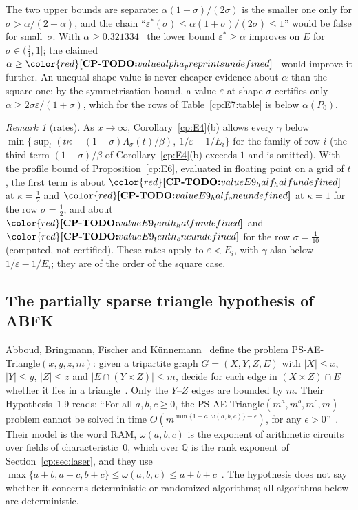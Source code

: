 \documentclass[11pt]{article}
\makeatletter
\theoremstyle{definition}
\theoremstyle{remark}
\newtheorem{remark}[theorem]{Remark}
\DeclareRobustCommand{\CPTODO}[1]{{\color{red}\textbf{[CP-TODO:} #1\textbf{]}}}
\providecommand{\eps}{\varepsilon}
\providecommand{\Q}{\mathbb{Q}}
\newcommand{\abs}[1]{\lvert #1\rvert}
\newcommand{\Lam}{\Lambda}                    %
\newcommand{\Pzero}{P_0}                      %
\newcommand{\cpv}[1]{\ifcsname cpv@#1\endcsname\csname cpv@#1\endcsname\else\CPTODO{value #1 undefined}\fi}
\newcommand{\AlphaVXXZ}{0.321334}%
\makeatother
\begin{document}
The two upper bounds are separate: $\alpha(1+\sigma)/(2\sigma)$ is the smaller one only for $\sigma>\alpha/(2-\alpha)$, and the chain ``$\eps^*(\sigma)\le\alpha(1+\sigma)/(2\sigma)\le1$'' would be false for small~$\sigma$. With $\alpha\ge\AlphaVXXZ$~\cite{VXXZ24} the lower bound $\eps^*\ge\alpha$ improves on $E$ for $\sigma\in(\frac34,1]$; the claimed $\alpha\ge\cpv{alpha_preprints}$~\cite{AvdBZ26,Uzn26} would improve it further. An unequal-shape value is never cheaper evidence about $\alpha$ than the square one: by the symmetrisation bound, a value $\eps$ at shape $\sigma$ certifies only $\alpha\ge2\sigma\eps/(1+\sigma)$, which for the rows of Table~\ref{cp:E7:table} is below $\alpha(\Pzero)$.

\begin{remark}[rates]\label{cp:E9}
As $x\to\infty$, Corollary~\ref{cp:E4}(b) allows every $\gamma$ below $\min\{\sup_t(t\kappa-(1+\sigma)\Lam_\sigma(t)/\beta),\ 1/\eps-1/E_i\}$ for the family of row $i$ (the third term $(1+\sigma)/\beta$ of Corollary~\ref{cp:E4}(b) exceeds $1$ and is omitted). With the profile bound of Proposition~\ref{cp:E6}, evaluated in floating point on a grid of $t$, the first term is about $\cpv{E9_half_half}$ at $\kappa=\frac12$ and $\cpv{E9_half_one}$ at $\kappa=1$ for the row $\sigma=\frac12$, and about $\cpv{E9_tenth_half}$ and $\cpv{E9_tenth_one}$ for the row $\sigma=\frac1{10}$ (computed, not certified). These rates apply to $\eps<E_i$, with $\gamma$ also below $1/\eps-1/E_i$; they are of the order of the square case.
\end{remark}

\subsection{The partially sparse triangle hypothesis of ABFK}\label{cp:sec:unequal-abfk}

Abboud, Bringmann, Fischer and Künnemann~\cite{ABFK24} define the problem PS-AE-Triangle$(x,y,z,m)$: given a tripartite graph $G=(X,Y,Z,E)$ with $\abs X\le x$, $\abs Y\le y$, $\abs Z\le z$ and $\abs{E\cap(Y\times Z)}\le m$, decide for each edge in $(X\times Z)\cap E$ whether it lies in a triangle~\cite[Definition~1.8]{ABFK24}. Only the $Y$--$Z$ edges are bounded by $m$. Their Hypothesis~1.9 reads: ``For all $a,b,c\ge0$, the PS-AE-Triangle$(m^a,m^b,m^c,m)$ problem cannot be solved in time $O(m^{\min\{1+a,\omega(a,b,c)\}-\epsilon})$, for any $\epsilon>0$''~\cite[Hypothesis~1.9]{ABFK24}. Their model is the word RAM, $\omega(a,b,c)$ is the exponent of arithmetic circuits over fields of characteristic~$0$, which over $\Q$ is the rank exponent of Section~\ref{cp:sec:laser}, and they use $\max\{a+b,a+c,b+c\}\le\omega(a,b,c)\le a+b+c$~\cite[Fact~2.2]{ABFK24}. The hypothesis does not say whether it concerns deterministic or randomized algorithms; all algorithms below are deterministic.
\end{document}
